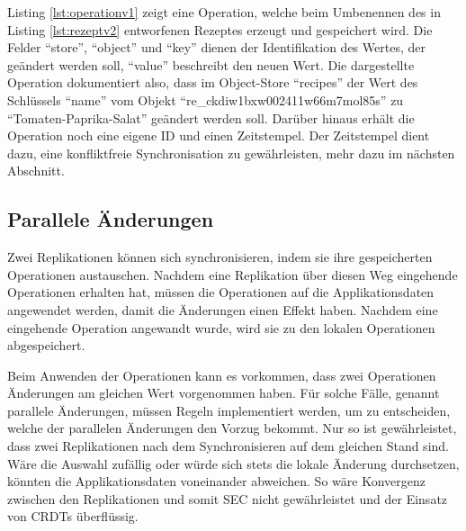 \documentclass[a4paper, 12pt]{scrreprt}
\begin{document}
Listing \ref{lst:operationv1} zeigt eine Operation, welche beim Umbenennen des in Listing \ref{lst:rezeptv2} entworfenen Rezeptes erzeugt und gespeichert wird. Die Felder \enquote{store}, \enquote{object} und  \enquote{key} dienen der Identifikation des Wertes, der geändert werden soll, \enquote{value} beschreibt den neuen Wert. Die dargestellte Operation dokumentiert also, dass im Object-Store \enquote{recipes} der Wert des Schlüssels \enquote{name} vom Objekt \enquote{re\_ckdiw1bxw002411w66m7mol85s} zu \enquote{Tomaten-Paprika-Salat} geändert werden soll. Darüber hinaus erhält die Operation noch eine eigene ID und einen Zeitstempel. Der Zeitstempel dient dazu, eine konfliktfreie Synchronisation zu gewährleisten, mehr dazu im nächsten Abschnitt. 

\begin{minipage}{\linewidth}
	
\end{minipage}

\subsection{Parallele Änderungen}
\label{sec:paralleleÄnderungen}

Zwei Replikationen können sich synchronisieren, indem sie ihre gespeicherten Operationen austauschen. Nachdem eine Replikation über diesen Weg eingehende Operationen erhalten hat, müssen die Operationen auf die Applikationsdaten angewendet werden, damit die Änderungen einen Effekt haben. Nachdem eine eingehende Operation angewandt wurde, wird sie zu den lokalen Operationen abgespeichert.

Beim Anwenden der Operationen kann es vorkommen, dass zwei Operationen Änderungen am gleichen Wert vorgenommen haben. Für solche Fälle, genannt parallele Änderungen, müssen Regeln implementiert werden, um zu entscheiden, welche der parallelen Änderungen den Vorzug bekommt. Nur so ist gewährleistet, dass zwei Replikationen nach dem Synchronisieren auf dem gleichen Stand sind. Wäre die Auswahl zufällig oder würde sich stets die lokale Änderung durchsetzen, könnten die Applikationsdaten voneinander abweichen. So wäre Konvergenz zwischen den Replikationen und somit \ac{SEC} nicht gewährleistet und der Einsatz von \acp{CRDT} überflüssig.
\end{document}
